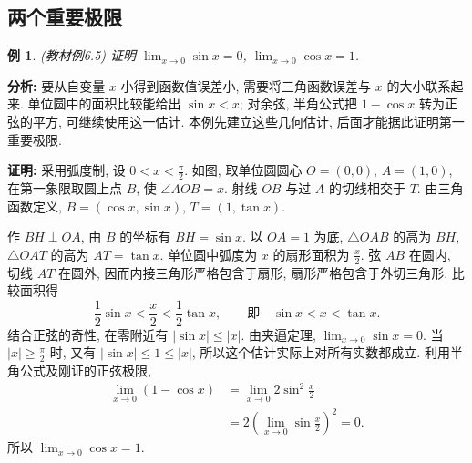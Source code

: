\documentclass[UTF8,openany]{ctexbook}
\theoremstyle{chinesetextbook}
\newtheorem{example}{例}[section]
\newenvironment{cnproof}{\par\indent\textbf{证明:} \ignorespaces}{\par}
\begin{document}
\subsection{两个重要极限}
\begin{example}
(教材例6.5) 证明 $\displaystyle \lim_{x\to0}\sin x=0$, $\displaystyle \lim_{x\to0}\cos x=1$.
\end{example}
\par\indent\textbf{分析:} 要从自变量 $x$ 小得到函数值误差小, 需要将三角函数误差与 $x$ 的大小联系起来. 单位圆中的面积比较能给出 $\sin x<x$; 对余弦, 半角公式把 $1-\cos x$ 转为正弦的平方, 可继续使用这一估计. 本例先建立这些几何估计, 后面才能据此证明第一重要极限.
\begin{cnproof}
采用弧度制, 设 $\displaystyle0<x<\frac\pi2$. 如图, 取单位圆圆心 $O=(0,0)$, $A=(1,0)$, 在第一象限取圆上点 $B$, 使 $\angle AOB=x$. 射线 $OB$ 与过 $A$ 的切线相交于 $T$. 由三角函数定义, $B=(\cos x,\sin x)$, $T=(1,\tan x)$.
\begin{center}
\end{center}
作 $BH\perp OA$, 由 $B$ 的坐标有 $BH=\sin x$. 以 $OA=1$ 为底, $\triangle OAB$ 的高为 $BH$, $\triangle OAT$ 的高为 $AT=\tan x$. 单位圆中弧度为 $x$ 的扇形面积为 $\displaystyle\frac x2$. 弦 $AB$ 在圆内, 切线 $AT$ 在圆外, 因而内接三角形严格包含于扇形, 扇形严格包含于外切三角形. 比较面积得
\[
\frac12\sin x<\frac x2<\frac12\tan x,
\qquad\text{即}\quad \sin x<x<\tan x.
\]
结合正弦的奇性, 在零附近有 $|\sin x|\le|x|$. 由夹逼定理, $\displaystyle\lim_{x\to0}\sin x=0$. 当 $\displaystyle|x|\ge\frac\pi2$ 时, 又有 $|\sin x|\le1\le|x|$, 所以这个估计实际上对所有实数都成立. 利用半角公式及刚证的正弦极限,
\[
\begin{aligned}
\lim_{x\to0}(1-\cos x)
&=\lim_{x\to0}2\sin^2\frac x2\\
&=2\left(\lim_{x\to0}\sin\frac x2\right)^2=0.
\end{aligned}
\]
所以 $\displaystyle\lim_{x\to0}\cos x=1$.
\end{cnproof}
\end{document}
